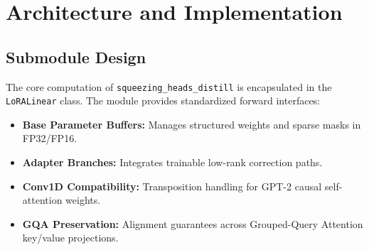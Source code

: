 \section{Architecture and Implementation}

\subsection{Submodule Design}
The core computation of \texttt{squeezing_heads_distill} is encapsulated in the \texttt{LoRALinear} class. The module provides standardized forward interfaces:
\begin{itemize}
\item \textbf{Base Parameter Buffers:} Manages structured weights and sparse masks in FP32/FP16.
\item \textbf{Adapter Branches:} Integrates trainable low-rank correction paths.
\item \textbf{Conv1D Compatibility:} Transposition handling for GPT-2 causal self-attention weights.
\item \textbf{GQA Preservation:} Alignment guarantees across Grouped-Query Attention key/value projections.
\end{itemize}
